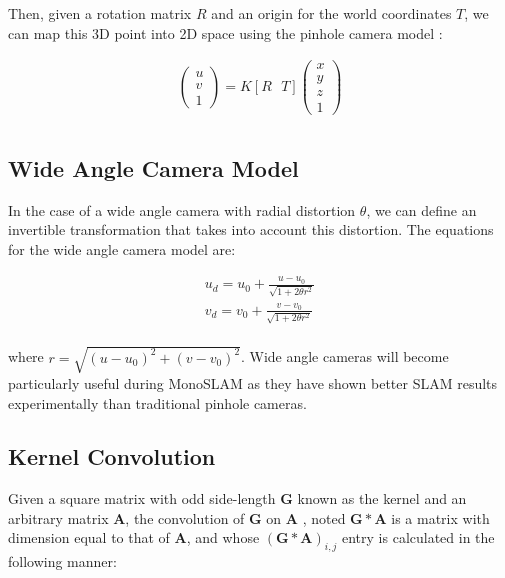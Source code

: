 \documentclass{article}
\begin{document}
Then, given a rotation matrix $R$ and an origin for the world coordinates $T$, we can map this 3D point into 2D space using the pinhole camera model \cite{Hartley2004}:

\begin{gather*}
\begin{pmatrix}
u \\
v \\
1
\end{pmatrix}
=
K[R \: \: \: T]
\begin{pmatrix}
x \\
y \\
z \\
1
\end{pmatrix} \\
\end{gather*}

\subsection{Wide Angle Camera Model}

In the case of a wide angle camera with radial distortion $\theta$, we can define an invertible transformation \cite{Swarninathan1999} that takes into account this distortion. The equations for the wide angle camera model are:

\begin{gather*}
u_d = u_0 + \frac{u - u_0}{\sqrt{1 + 2 \theta r^2}} \\
v_d = v_0 + \frac{v - v_0}{\sqrt{1 + 2 \theta r^2}} \\
\end{gather*}

where $r = \sqrt{(u - u_0)^2 + (v - v_0)^2}$. Wide angle cameras will become particularly useful during MonoSLAM as they have shown better SLAM results experimentally than traditional pinhole cameras. \\

\subsection{Kernel Convolution}

Given a square matrix with odd side-length $\mathbf{G}$ known as the kernel and an arbitrary matrix $\mathbf{A}$, the convolution of $\mathbf{G}$ on $\mathbf{A}$ \cite{EdgeDetection}, noted $\mathbf{G} * \mathbf{A}$ is a matrix with dimension equal to that of $\mathbf{A}$, and whose $(\mathbf{G} * \mathbf{A})_{i, j}$ entry is calculated in the following manner:
\end{document}
